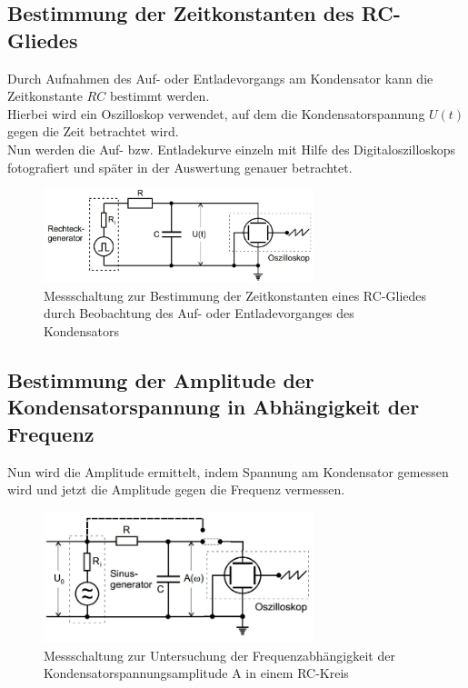 \subsection{Bestimmung der Zeitkonstanten des RC-Gliedes}
Durch Aufnahmen des Auf- oder Entladevorgangs am Kondensator kann
die Zeitkonstante $RC$ bestimmt werden.\\
Hierbei wird ein Oszilloskop verwendet, auf dem die Kondensatorspannung $U(t)$ gegen die Zeit betrachtet wird. \\
Nun werden die Auf- bzw. Entladekurve einzeln mit Hilfe des Digitaloszilloskops fotografiert und später in der Auswertung genauer betrachtet.
\begin{figure}[h]
  \centering
  \includegraphics[width=0.7\textwidth]{Grafiken/V353_Abb1.jpg}
  \caption{Messschaltung zur Bestimmung der Zeitkonstanten eines RC-Gliedes durch Beobachtung des 
  Auf- oder Entladevorganges des Kondensators }
  \label{fig:V353_Abb1}
\end{figure}
\subsection{Bestimmung der Amplitude der Kondensatorspannung in Abhängigkeit der Frequenz}

Nun wird die Amplitude ermittelt, indem Spannung am Kondensator gemessen wird und jetzt die Amplitude gegen die Frequenz vermessen.
\begin{figure}[h]
  \centering
  \includegraphics[width=0.7\textwidth]{Grafiken/V353_Abb2.jpg}
  \caption{Messschaltung zur Untersuchung der Frequenzabhängigkeit der Kondensatorspannungsamplitude A in einem RC-Kreis}
  \label{fig:V353_Abb2}
\end{figure}
